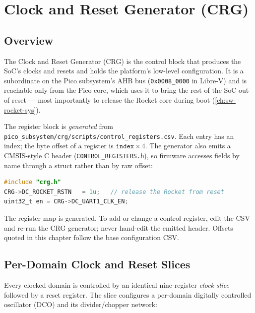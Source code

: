 \chapter{Clock and Reset Generator (CRG)}\label{ch:sw-crg}

\section{Overview}
The Clock and Reset Generator (CRG) is the control block that produces the SoC's clocks and resets and
holds the platform's low-level configuration. It is a subordinate on the Pico subsystem's AHB bus
(\texttt{0x0008\_0000} in Libre-V) and is reachable only from the Pico core, which uses it to bring the
rest of the SoC out of reset --- most importantly to release the Rocket core during boot
(\autoref{ch:sw-rocket-sys}).

The register block is \emph{generated} from
\texttt{pico\_subsystem/crg/scripts/control\_registers.csv}. Each entry has an index; the byte offset of
a register is $\texttt{index} \times 4$. The generator also emits a CMSIS-style C header
(\texttt{CONTROL\_REGISTERS.h}), so firmware accesses fields by name through a struct rather than by raw
offset:
\begin{lstlisting}[language=C]
#include "crg.h"
CRG->DC_ROCKET_RSTN   = 1u;   // release the Rocket from reset
uint32_t en = CRG->DC_UART1_CLK_EN;
\end{lstlisting}

\begin{docnote}
The register map is generated. To add or change a control register, edit the CSV and re-run the CRG
generator; never hand-edit the emitted header. Offsets quoted in this chapter follow the base
configuration CSV.
\end{docnote}

\section{Per-Domain Clock and Reset Slices}
Every clocked domain is controlled by an identical nine-register \emph{clock slice} followed by a reset
register. The slice configures a per-domain digitally controlled oscillator (DCO) and its divider/chopper
network:

